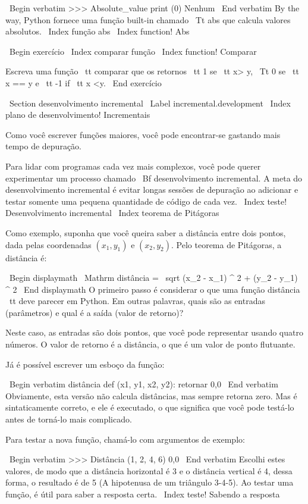 \documentclass[10pt]{book}
\begin{document}
\begin {itemize}
{{{{\ Begin {verbatim}
>>> Absolute_value print (0)
Nenhum
\ End {verbatim}
%
By the way, Python fornece uma função built-in chamado 
{\ Tt abs} que calcula valores absolutos.
\ Index {função abs}
\ Index {function! Abs}

\ Begin {} exercício
\ Index {comparar função}
\ Index {function! Comparar}

Escreva uma função {\ tt comparar}
que os retornos {\ tt 1} se {\ tt x> y},
{\ Tt 0} se {\ tt x == y} e {\ tt -1} if {\ tt x <y}.
\ End {} exercício


\ Section {desenvolvimento incremental}
\ Label {} incremental.development
\ Index {plano de desenvolvimento! Incrementais}

Como você escrever funções maiores, você pode encontrar-se
gastando mais tempo de depuração.

Para lidar com programas cada vez mais complexos,
você pode querer experimentar um processo chamado
{\ Bf desenvolvimento incremental}. A meta do desenvolvimento incremental
é evitar longas sessões de depuração ao adicionar e testar somente
uma pequena quantidade de código de cada vez.
\ Index {teste! Desenvolvimento incremental}
\ Index {teorema de Pitágoras}

Como exemplo, suponha que você queira saber a distância entre dois
pontos, dada pelas coordenadas $ (x_1, y_1) $ e $ (x_2, y_2) $.
Pelo teorema de Pitágoras, a distância é:

\ Begin {displaymath}
\ Mathrm {distância} = \ sqrt {(x_2 - x_1) ^ 2 + (y_2 - y_1) ^ 2}
\ End {displaymath}
%
O primeiro passo é considerar o que uma função distância {\ tt} deve
parecer em Python. Em outras palavras, quais são as entradas (parâmetros)
e qual é a saída (valor de retorno)?

Neste caso, as entradas são dois pontos, que você pode representar
usando quatro números. O valor de retorno é a distância, o que é
um valor de ponto flutuante.

Já é possível escrever um esboço da função:

\ Begin {verbatim}
distância def (x1, y1, x2, y2):
    retornar 0,0
\ End {verbatim}
%
Obviamente, esta versão não calcula distâncias, mas sempre retorna
zero. Mas é sintaticamente correto, e ele é executado, o que significa que
você pode testá-lo antes de torná-lo mais complicado.

Para testar a nova função, chamá-lo com argumentos de exemplo:

\ Begin {verbatim}
>>> Distância (1, 2, 4, 6)
0,0
\ End {verbatim}
%
Escolhi estes valores, de modo que a distância horizontal é 3 e o
distância vertical é 4, dessa forma, o resultado é de 5
(A hipotenusa de um triângulo 3-4-5). Ao testar uma função, é
útil para saber a resposta certa.
\ Index {teste! Sabendo a resposta}

}}}}
\end{itemize}
\end{document}
